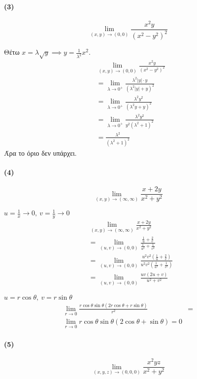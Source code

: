 \documentclass[11pt,a4paper,titlepage]{article}
\begin{document}
\paragraph{(3)}
\[
\lim_{(x,y) \to (0,0)} \frac{x^2y}{(x^2-y^2)^2}
\]

Θέτω \(x = \lambda \sqrt y \implies y = \frac{1}{\lambda^2} x^2 \).
\begin{align*}
&\lim_{(x,y) \to (0,0)} \frac{x^2y}{(x^2-y^2)^2} \\
&= \lim_{\lambda \to 0^+} \frac{\lambda^2 |y| \cdot y}{\left( \lambda^2 |y| + y \right)^2} \\
&= \lim_{\lambda \to 0^+} \frac{\lambda^2 y^2}{\left( \lambda^2 y + y \right)^2} \\
&= \lim_{\lambda \to 0^+} \frac{\lambda^2 y^2}{y^ 2 \left( \lambda^2 +1 \right)^2} \\
&= \frac{\lambda^2}{(\lambda^2+1)^2}
\end{align*}
Άρα το όριο δεν υπάρχει.

\paragraph{(4)}
\[
\lim_{(x,y) \to (\infty,\infty)} \frac{x+2y}{x^2+y^2}
\]

\(u=\frac{1}{x} \to 0, \ v = \frac{1}{y} \to 0\)
\begin{align*}
&\lim_{(x,y) \to (\infty,\infty)} \frac{x+2y}{x^2+y^2}
\\ &=
\lim_{(u,v) \to (0,0)} \frac{\frac{1}{u} + \frac{2}{v}}{\frac{1}{u^2}+ \frac{1}{v^2}}
\\ &=
\lim_{(u,v) \to (0,0)} \frac{u^2v^2 \left( \frac{1}{u}+\frac{2}{v} \right)}{u^2v^2 \left( \frac{1}{u^2}+\frac{1}{v^2} \right)}
\\ &=
\lim_{(u,v) \to (0,0)} \frac{uv (2u+v)}{u^2+v^2}
\end{align*}

\(u =r\cos \theta,\ v=r\sin\theta\)
\begin{align*}
\lim_{r \to 0} \frac{r\cos\theta\sin\theta (2r \cos\theta + r \sin\theta)}{r^2} &= \\
\lim_{r \to 0} r\cos\theta\sin\theta (2\cos\theta+\sin\theta) = 0
\end{align*}


\paragraph{(5)}
\[
\lim_{(x,y,z) \to (0,0,0)} \frac{x^2yz}{x^2+y^2}
\]
\end{document}
